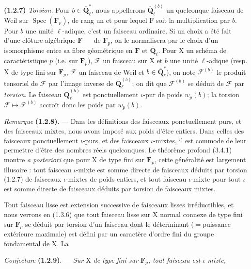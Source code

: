 \documentclass[11pt,leqno]{article}
\newcommand{\Page}[1]{\ifvmode\noindent\else\unskip\ \fi{\footnotesize\textcolor{gray}{[p.\,#1]}}\ \ignorespaces}
\begin{document}
\textbf{(1.2.7)} \textit{Torsion.} Pour \(b\in\overline{\mathbf{Q}}_\ell^*\), nous appellerons \(\overline{\mathbf{Q}}_\ell^{(b)}\) un quelconque faisceau de Weil sur \(\operatorname{Spec}(\mathbf{F}_p)\), de rang un et pour lequel \(\mathrm{F}\) soit la multiplication par \(b\). Pour \(b\) une unité \(\ell\)-adique, c’est un faisceau ordinaire. Si un choix a été fait d’une clôture algébrique \(\mathbf{F}\)
\Page{155}
de \(\mathbf{F}_p\), on le normalisera par le choix d’un isomorphisme entre sa fibre géométrique en \(\mathbf{F}\) et \(\overline{\mathbf{Q}}_\ell\). Pour \(\mathrm{X}\) un schéma de caractéristique \(p\) (i.e. sur \(\mathbf{F}_p\)), \(\mathscr{F}\) un faisceau sur \(\mathrm{X}\) et \(b\) une unité \(\ell\)-adique (resp. \(\mathrm{X}\) de type fini sur \(\mathbf{F}_p\), \(\mathscr{F}\) un faisceau de Weil et \(b\in\overline{\mathbf{Q}}_\ell^*\)), on note \(\mathscr{F}^{(b)}\) le produit tensoriel de \(\mathscr{F}\) par l’image inverse de \(\overline{\mathbf{Q}}_\ell^{(b)}\); on dit que \(\mathscr{F}^{(b)}\) se déduit de \(\mathscr{F}\) par \textit{torsion}. Le faisceau \(\overline{\mathbf{Q}}_\ell^{(b)}\) est ponctuellement \(\iota\)-pur de poids \(w_p(b)\); la torsion \(\mathscr{F}\mapsto\mathscr{F}^{(b)}\) accroît donc les poids par \(w_p(b)\).

\textit{Remarque} \textbf{(1.2.8)}. — Dans les définitions des faisceaux ponctuellement purs, et des faisceaux mixtes, nous avons imposé aux poids d’être entiers. Dans celles des faisceaux ponctuellement \(\iota\)-purs, et des faisceaux \(\iota\)-mixtes, il est commode de leur permettre d’être des nombres réels quelconques. Le théorème profond (3.4.1) montre \textit{a posteriori} que pour \(\mathrm{X}\) de type fini sur \(\mathbf{F}_p\), cette généralité est largement illusoire : tout faisceau \(\iota\)-mixte est somme directe de faisceaux déduits par torsion (1.2.7) de faisceaux \(\iota\)-mixtes de poids entiers, et tout faisceau \(\iota\)-mixte pour tout \(\iota\) est somme directe de faisceaux déduits par torsion de faisceaux mixtes.

Tout faisceau lisse est extension successive de faisceaux lisses irréductibles, et nous verrons en (1.3.6) que tout faisceau lisse sur \(\mathrm{X}\) normal connexe de type fini sur \(\mathbf{F}_p\) se déduit par torsion d’un faisceau dont le déterminant (\(=\)puissance extérieure maximale) est défini par un caractère d’ordre fini du groupe fondamental de \(\mathrm{X}\). La

\textit{Conjecture} \textbf{(1.2.9)}. — \textit{Sur \(\mathrm{X}\) de type fini sur \(\mathbf{F}_p\), tout faisceau est \(\iota\)-mixte,}
\end{document}
